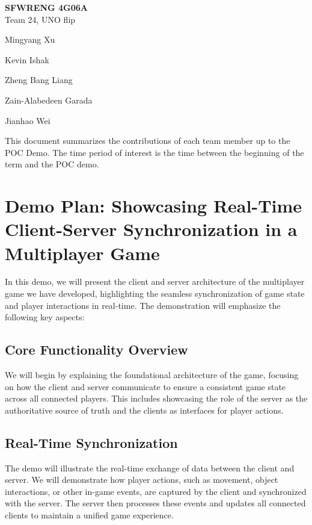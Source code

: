 \documentclass[12pt]{article}
\begin{document}
\begin{center}
    \Large \textbf{SFWRENG 4G06A} \\[10pt]
    \normalsize Team 24, UNO flip
\end{center}


\begin{center}
    
        \item Mingyang Xu
        \item Kevin Ishak
        \item Zheng Bang Liang
        \item Zain-Alabedeen Garada
        \item Jianhao Wei
    
\end{center}

This document summarizes the contributions of each team member up to the POC Demo. The time period of interest is the time between the beginning of the term and the POC demo.


\section{Demo Plan: Showcasing Real-Time Client-Server Synchronization in a Multiplayer Game}

In this demo, we will present the client and server architecture of the multiplayer game we have developed, highlighting the seamless synchronization of game state and player interactions in real-time. The demonstration will emphasize the following key aspects:

\subsection{Core Functionality Overview}
We will begin by explaining the foundational architecture of the game, focusing on how the client and server communicate to ensure a consistent game state across all connected players. This includes showcasing the role of the server as the authoritative source of truth and the clients as interfaces for player actions.

\subsection{Real-Time Synchronization}
The demo will illustrate the real-time exchange of data between the client and server. We will demonstrate how player actions, such as movement, object interactions, or other in-game events, are captured by the client and synchronized with the server. The server then processes these events and updates all connected clients to maintain a unified game experience.
\end{document}
